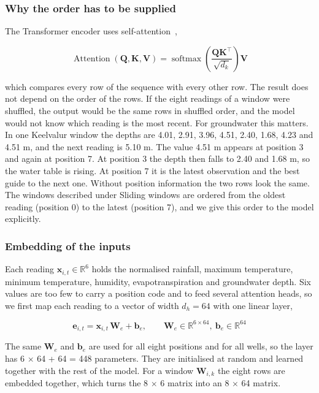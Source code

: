 \documentclass[conference]{IEEEtran}
\begin{document}
\subsubsection{Why the order has to be supplied}

The Transformer encoder uses self-attention~\cite{ref22},

\begin{equation}
\operatorname{Attention}(\mathbf{Q},\mathbf{K},\mathbf{V}) = \operatorname{softmax}\!\left(\frac{\mathbf{Q}\mathbf{K}^{\top}}{\sqrt{d_k}}\right)\mathbf{V}\label{eq:12}
\end{equation}

which compares every row of the sequence with every other row. The result does not depend on the order of the rows. If the eight readings of a window were shuffled, the output would be the same rows in shuffled order, and the model would not know which reading is the most recent. For groundwater this matters. In one Keelvalur window the depths are 4.01, 2.91, 3.96, 4.51, 2.40, 1.68, 4.23 and 4.51 m, and the next reading is 5.10 m. The value 4.51 m appears at position 3 and again at position 7. At position 3 the depth then falls to 2.40 and 1.68 m, so the water table is rising. At position 7 it is the latest observation and the best guide to the next one. Without position information the two rows look the same. The windows described under Sliding windows are ordered from the oldest reading (position 0) to the latest (position 7), and we give this order to the model explicitly.

\subsubsection{Embedding of the inputs}

Each reading \(\mathbf{x}_{i,t} \in \mathbb{R}^{6}\) holds the normalised rainfall, maximum temperature, minimum temperature, humidity, evapotranspiration and groundwater depth. Six values are too few to carry a position code and to feed several attention heads, so we first map each reading to a vector of width \(d_h = 64\) with one linear layer,

\begin{equation}
\mathbf{e}_{i,t} = \mathbf{x}_{i,t}\,\mathbf{W}_e + \mathbf{b}_e, \qquad \mathbf{W}_e \in \mathbb{R}^{6 \times 64},\ \mathbf{b}_e \in \mathbb{R}^{64}\label{eq:13}
\end{equation}

The same \(\mathbf{W}_e\) and \(\mathbf{b}_e\) are used for all eight positions and for all wells, so the layer has 6 \ensuremath{\times} 64 + 64 = 448 parameters. They are initialised at random and learned together with the rest of the model. For a window \(\mathbf{W}_{i,k}\) the eight rows are embedded together, which turns the 8 \ensuremath{\times} 6 matrix into an 8 \ensuremath{\times} 64 matrix.
\end{document}
